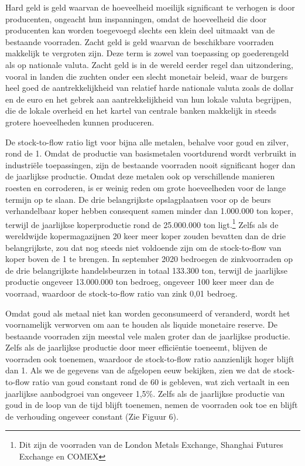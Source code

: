 Hard geld is geld waarvan de hoeveelheid moeilijk significant te verhogen is door producenten, ongeacht hun inspanningen, omdat de hoeveelheid die door producenten kan worden toegevoegd slechts een klein deel uitmaakt van de bestaande voorraden. Zacht geld is geld waarvan de beschikbare voorraden makkelijk te vergroten zijn. Deze term is zowel van toepassing op goederengeld als op nationale valuta. Zacht geld is in de wereld eerder regel dan uitzondering, vooral in landen die zuchten onder een slecht monetair beleid, waar de burgers heel goed de aantrekkelijkheid van relatief harde nationale valuta zoals de dollar en de euro en het gebrek aan aantrekkelijkheid van hun lokale valuta begrijpen, die de lokale overheid en het kartel van centrale banken makkelijk in steeds grotere hoeveelheden kunnen produceren.

De stock-to-flow ratio ligt voor bijna alle metalen, behalve voor goud en zilver, rond de 1. Omdat de productie van basismetalen voortdurend wordt verbruikt in industriële toepassingen, zijn de bestaande voorraden nooit significant hoger dan de jaarlijkse productie. Omdat deze metalen ook op verschillende manieren roesten en corroderen, is er weinig reden om grote hoeveelheden voor de lange termijn op te slaan. De drie belangrijkste opslagplaatsen voor op de beurs verhandelbaar koper hebben consequent samen minder dan 1.000.000 ton koper, terwijl de jaarlijkse koperproductie rond de 25.000.000 ton ligt.\footnote{Dit zijn de voorraden van de London Metals Exchange, Shanghai Futures Exchange en COMEX} Zelfs als de wereldwijde kopermagazijnen 20 keer meer koper zouden bevatten dan de drie belangrijkste, zou dat nog steeds niet voldoende zijn om de stock-to-flow van koper boven de 1 te brengen. In september 2020 bedroegen de zinkvoorraden op de drie belangrijkste handelsbeurzen in totaal 133.300 ton, terwijl de jaarlijkse productie ongeveer 13.000.000 ton bedroeg, ongeveer 100 keer meer dan de voorraad, waardoor de stock-to-flow ratio van zink 0,01 bedroeg.\autocite{112}

Omdat goud als metaal niet kan worden geconsumeerd of veranderd, wordt het voornamelijk verworven om aan te houden als liquide monetaire reserve. De bestaande voorraden zijn meestal vele malen groter dan de jaarlijkse productie. Zelfs als de jaarlijkse productie door meer efficiëntie toeneemt, blijven de voorraden ook toenemen, waardoor de stock-to-flow ratio aanzienlijk hoger blijft dan 1. Als we de gegevens van de afgelopen eeuw bekijken, zien we dat de stock-to-flow ratio van goud constant rond de 60 is gebleven, wat zich vertaalt in een jaarlijkse aanbodgroei van ongeveer 1,5\%. Zelfs als de jaarlijkse productie van goud in de loop van de tijd blijft toenemen, nemen de voorraden ook toe en blijft de verhouding ongeveer constant (Zie Figuur 6).

